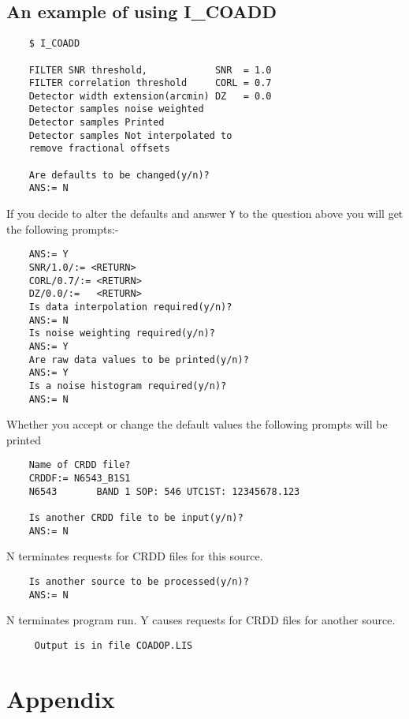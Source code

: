 \subsection{An example of using I\_COADD}

\begin{verbatim}
    $ I_COADD

    FILTER SNR threshold,            SNR  = 1.0
    FILTER correlation threshold     CORL = 0.7
    Detector width extension(arcmin) DZ   = 0.0
    Detector samples noise weighted
    Detector samples Printed
    Detector samples Not interpolated to
    remove fractional offsets

    Are defaults to be changed(y/n)?
    ANS:= N
\end{verbatim}
If you decide to alter the defaults and answer {\tt Y} to the question above
you will get the following prompts:-

\begin{verbatim}
    ANS:= Y                     
    SNR/1.0/:= <RETURN>                
    CORL/0.7/:= <RETURN>
    DZ/0.0/:=   <RETURN>
    Is data interpolation required(y/n)? 
    ANS:= N                     
    Is noise weighting required(y/n)?  
    ANS:= Y
    Are raw data values to be printed(y/n)? 
    ANS:= Y
    Is a noise histogram required(y/n)? 
    ANS:= N
\end{verbatim}
Whether you accept or change the default values the following prompts will be
printed
\begin{verbatim}
    Name of CRDD file? 
    CRDDF:= N6543_B1S1            
    N6543       BAND 1 SOP: 546 UTC1ST: 12345678.123  

    Is another CRDD file to be input(y/n)? 
    ANS:= N
\end{verbatim}
N terminates requests for CRDD files for this source.

\begin{verbatim}
    Is another source to be processed(y/n)? 
    ANS:= N
\end{verbatim}
N  terminates  program  run. Y causes requests for CRDD files for another source.

\begin{verbatim}
     Output is in file COADOP.LIS 
\end{verbatim}

\pagebreak

\section{Appendix}

